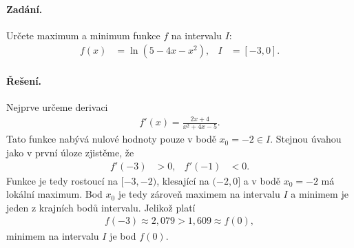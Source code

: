 \documentclass[a4paper,11pt]{article}
\begin{document}
	\paragraph*{Zadání.} Určete maximum a minimum funkce $f$ na intervalu $I$:
	\begin{align*}
		f(x) &= \ln(5-4x-x^2),
	&
		I &= [-3,0].
	\end{align*}
	
	\paragraph*{Řešení.} Nejprve určeme derivaci
	\begin{align*}
		f'(x) = \frac{2x+4}{x^2+4x-5}.
	\end{align*}
	Tato funkce nabývá nulové hodnoty pouze v bodě $x_0 = -2 \in I$. Stejnou úvahou jako v první úloze zjistěme, že
	\begin{align*}
		f'(-3) &> 0,
	&
		f'(-1) &< 0.
	\end{align*}
	Funkce je tedy rostoucí na $[-3,-2)$, klesající na $(-2,0]$ a v bodě $x_0 = -2$ má lokální maximum. Bod $x_0$ je tedy zároveň maximem na intervalu $I$ a minimem je jeden z krajních bodů intervalu. Jelikož platí
	\begin{align*}
		f(-3) \approx 2,079 > 1,609 \approx f(0),
	\end{align*}
	minimem na intervalu $I$ je bod $f(0)$.
	
	
\end{document}
